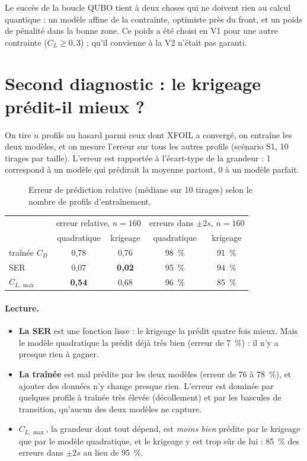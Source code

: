 \begin{resultat}
Le succès de la boucle QUBO tient à deux choses qui ne doivent rien au calcul quantique : un modèle affine de la contrainte, optimiste près du front, et un poids de pénalité dans la bonne zone. Ce poids a été choisi en V1 pour une autre contrainte ($C_L\ge0{,}3$) ; qu'il convienne à la V2 n'était pas garanti.
\end{resultat}

\section{Second diagnostic : le krigeage prédit-il mieux ?}
On tire $n$ profils au hasard parmi ceux dont XFOIL a convergé, on entraîne les deux modèles, et on mesure l'erreur sur tous les autres profils (scénario S1, 10 tirages par taille). L'erreur est rapportée à l'écart-type de la grandeur : 1 correspond à un modèle qui prédirait la moyenne partout, 0 à un modèle parfait.

\begin{figure}[htbp]
\centering

\caption{Erreur de prédiction relative (médiane sur 10 tirages) selon le nombre de profils d'entraînement.}\label{fig:diag-qualite}
\end{figure}

\begin{center}
\begin{tabular}{lcccc}
\toprule
 & \multicolumn{2}{c}{erreur relative, $n=160$} & \multicolumn{2}{c}{erreurs dans $\pm2s$, $n=160$} \\
 & quadratique & krigeage & quadratique & krigeage \\
\midrule
traînée $C_D$ & 0,78 & 0,76 & 98~\% & 91~\% \\
SER & 0,07 & \textbf{0,02} & 95~\% & 94~\% \\
$C_{L,\max}$ & \textbf{0,54} & 0,68 & 96~\% & 85~\% \\
\bottomrule
\end{tabular}
\end{center}

\paragraph{Lecture.}
\begin{itemize}
\item \textbf{La SER} est une fonction lisse : le krigeage la prédit quatre fois mieux. Mais le modèle quadratique la prédit déjà très bien (erreur de 7~\%) : il n'y a presque rien à gagner.
\item \textbf{La traînée} est mal prédite par les deux modèles (erreur de 76 à 78~\%), et ajouter des données n'y change presque rien. L'erreur est dominée par quelques profils à traînée très élevée (décollement) et par les bascules de transition, qu'aucun des deux modèles ne capture.
\item \textbf{$C_{L,\max}$}, la grandeur dont tout dépend, est \emph{moins bien} prédite par le krigeage que par le modèle quadratique, et le krigeage y est trop sûr de lui : 85~\% des erreurs dans $\pm2s$ au lieu de 95~\%.
\end{itemize}

